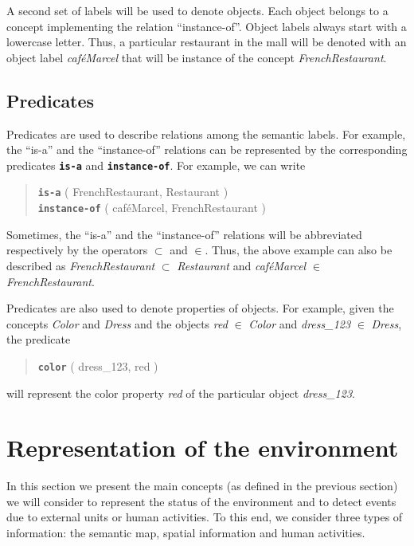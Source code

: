 \documentclass{article}
\begin{document}
A second set of labels will be used to denote objects. Each object belongs to a concept implementing the relation ``instance-of''. Object labels always start with a lowercase letter.
Thus, a particular restaurant in the mall will be denoted with an object label \emph{caf\'eMarcel} that will be instance of the concept \emph{FrenchRestaurant}. 


\subsection{Predicates}

Predicates are used to describe relations among the semantic labels. For example, the ``is-a'' and the ``instance-of'' relations can be represented by the corresponding predicates {\tt\bf is-a} and {\tt\bf instance-of}. For example, we can write

\begin{quote}
{\tt\bf is-a} ( FrenchRestaurant, Restaurant )\\
{\tt\bf instance-of} ( caf\'eMarcel, FrenchRestaurant )\\
\end{quote}

Sometimes,  the ``is-a'' and the ``instance-of'' relations will be abbreviated respectively by
the operators $\subset$ and $\in$.
Thus, the above example can also be described as \emph{FrenchRestaurant} $\subset$ \emph{Restaurant} and \emph{caf\'eMarcel} $\in$ \emph{FrenchRestaurant}.


Predicates are also used to denote properties of objects. For example, given the concepts \emph{Color} and \emph{Dress} and the objects \emph{red} $\in$ \emph{Color} and \emph{dress\_123} $\in$ \emph{Dress}, the predicate 

\begin{quote}
{\tt\bf color} ( dress\_123,  red )
\end{quote}

\noindent
will represent the color property \emph{red} of the particular object  \emph{dress\_123}.


\section {Representation of the environment}

In this section we present the main concepts (as defined in the previous section) we will consider to represent the status of the environment and to detect events due to external units or human activities. To this end, we consider three types of information: the semantic map, spatial information and human activities.
\end{document}
